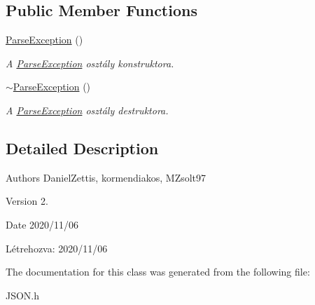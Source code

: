 \subsection*{Public Member Functions}
\begin{DoxyCompactItemize}
\item 
\mbox{\label{classJSON_1_1ParseException_af9bac4bf2265cc9c322ca0aa6cc95b29}} 
\hyperlink{classJSON_1_1ParseException_af9bac4bf2265cc9c322ca0aa6cc95b29}{Parse\+Exception} ()
\begin{DoxyCompactList}\small\item\em A \hyperlink{classJSON_1_1ParseException}{Parse\+Exception} osztály konstruktora. \end{DoxyCompactList}\item 
\mbox{\label{classJSON_1_1ParseException_a8203c1af2b7f9eb83425ff04c4bd9e28}} 
\hyperlink{classJSON_1_1ParseException_a8203c1af2b7f9eb83425ff04c4bd9e28}{$\sim$\+Parse\+Exception} ()
\begin{DoxyCompactList}\small\item\em A \hyperlink{classJSON_1_1ParseException}{Parse\+Exception} osztály destruktora. \end{DoxyCompactList}\end{DoxyCompactItemize}


\subsection{Detailed Description}
\begin{DoxyAuthor}{Authors}
Daniel\+Zettis, kormendiakos, M\+Zsolt97
\end{DoxyAuthor}
\begin{DoxyVersion}{Version}
2.
\end{DoxyVersion}
\begin{DoxyDate}{Date}
2020/11/06
\end{DoxyDate}
Létrehozva\+: 2020/11/06 

The documentation for this class was generated from the following file\+:\begin{DoxyCompactItemize}
\item 
J\+S\+O\+N.\+h\end{DoxyCompactItemize}
